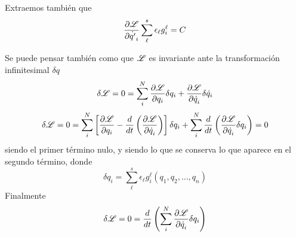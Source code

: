 \documentclass[10pt,oneside]{CBFT_book}
\begin{document}
Extraemos también que 
\[
	\dpar{\Lag}{\dot{q'}_i} \sum_\ell^s \epsilon_\ell g_i^\ell = C
\]

Se puede pensar también como que $\Lag$ es invariante ante la transformación infinitesimal
$\delta q$
\[
	\delta\Lag = 0 = \sum_i^N \dpar{\Lag}{q_i}\delta q_i + \dpar{\Lag}{\dot{q}_i}\delta \dot{q}_i
\]
\[
	\delta\Lag = 0 = \sum_i^N \left[ \dpar{\Lag}{q_i} - \frac{d}{dt}\left( \dpar{\Lag}{\dot{q}_i} \right)
	\right]\delta q_i  + \sum_i^N \frac{d}{dt}\left( \dpar{\Lag}{\dot{q}_i} \delta q_i \right)  = 0
\]
siendo el primer término nulo, y siendo lo que se conserva lo que aparece en el segundo término,
donde 
\[
	\delta q_i =  \sum_\ell^s \epsilon_\ell g_i^\ell(q_1,q_2,...,q_n)
\]
Finalmente 
\[
	\delta \Lag = 0 = \frac{d}{dt}\left( \sum_i^N \dpar{\Lag}{\dot{q}_i} \delta q_i \right) 
\]




\end{document}
